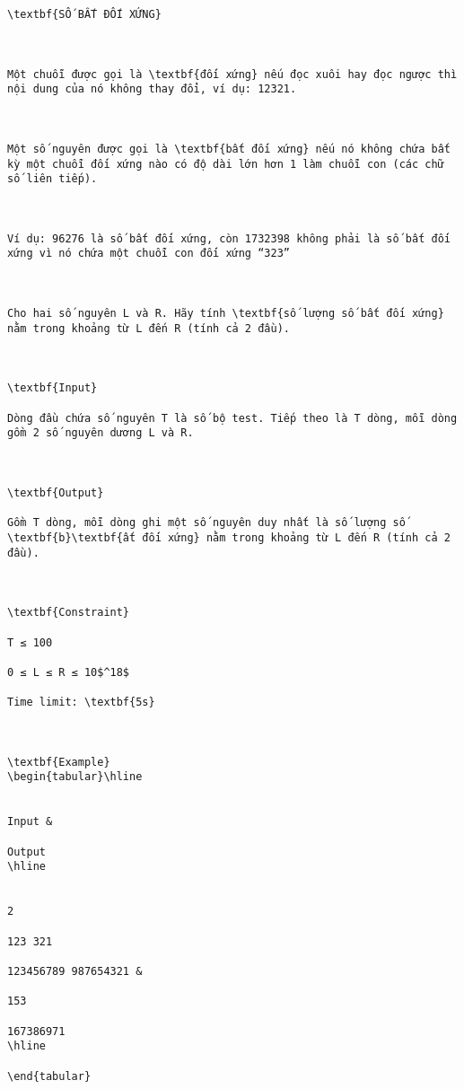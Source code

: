 
\begin{verbatim}



\textbf{SỐ BẤT ĐỐI XỨNG}

 

Một chuỗi được gọi là \textbf{đối xứng} nếu đọc xuôi hay đọc ngược thì nội dung của nó không thay đổi, ví dụ: 12321.

 

Một số nguyên được gọi là \textbf{bất đối xứng} nếu nó không chứa bất kỳ một chuỗi đối xứng nào có độ dài lớn hơn 1 làm chuỗi con (các chữ số liên tiếp).

 

Ví dụ: 96276 là số bất đối xứng, còn 1732398 không phải là số bất đối xứng vì nó chứa một chuỗi con đối xứng “323”

 

Cho hai số nguyên L và R. Hãy tính \textbf{số lượng số bất đối xứng} nằm trong khoảng từ L đến R (tính cả 2 đầu).

 

\textbf{Input}

Dòng đầu chứa số nguyên T là số bộ test. Tiếp theo là T dòng, mỗi dòng gồm 2 số nguyên dương L và R.

 

\textbf{Output}

Gồm T dòng, mỗi dòng ghi một số nguyên duy nhất là số lượng số \textbf{b}\textbf{ất đối xứng} nằm trong khoảng từ L đến R (tính cả 2 đầu).

 

\textbf{Constraint}

T ≤ 100

0 ≤ L ≤ R ≤ 10$^18$

Time limit: \textbf{5s}

 

\textbf{Example}
\begin{tabular}\hline 


Input & 

Output  
\hline


2

123 321

123456789 987654321 & 

153

167386971  
\hline

\end{tabular}

 \end{verbatim}
